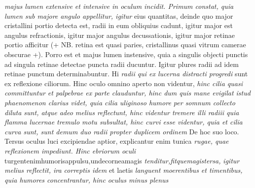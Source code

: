 \textit{majus lumen extensive et intensive in oculum incidit. Primum constat, quia lumen sub majore angulo appellitur, igitur } eius quantitas, deinde quo major cristallini portio detecta est, radii in eum obliquius cadunt, igitur major est angulus refractionis\protect{}, igitur major angulus decussationis\protect{}, igitur major retinae portio afficitur (+ NB. retina est quasi paries, cristallinus quasi vitrum camerae obscurae\protect{} +). Porro est et majus lumen instensive, quia a singulis objecti punctis ad singula retinae detectae puncta radii ducuntur. Igitur plures radii ad idem retinae punctum determinabuntur. Hi \textit{radii qui ex lucerna distracti progredi } sunt ex reflexione ciliorum\protect{}. Hinc oculo omnino aperto non videntur, \textit{hinc cilia\protect{} quasi committuntur et palpebrae\protect{} ex parte clauduntur, hinc dum quis mane evigilat istud phaenomenon clarius videt, quia cilia uliginoso humore\protect{} per somnum collecto diluta sunt, atque adeo melius reflectunt, hinc videntur tremere illi radiii quia flamma lucernae tremulo motu subsultat, hinc curvi esse videntur, quia et cilia curva sunt, sunt demum duo radii propter duplicem ordinem } De hoc suo loco. Tersus oculus luci excipiendae aptior, explicantur enim tunica \textit{rugae, quae reflexionem impediunt. Hinc ebriorum oculi }\hfill turgent\hfill enim\hfill humoris\hfill appulsu,\hfill unde\hfill cornea\hfill magis\hfill
\textit{tenditur,\hfill fitque\hfill magis\hfill tersa,}
\textit{igitur melius reflectit, ira correptis idem } et laetis \textit{languent moerentibus et timentibus, quia humores concentrantur, hinc oculus minus plenus }
\pend
\count{}
\count{} 
